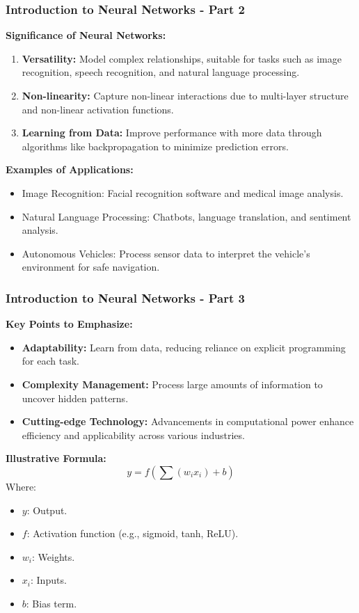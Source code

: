 \documentclass[aspectratio=169]{beamer}
\begin{document}
\begin{frame}[fragile]
    \frametitle{Introduction to Neural Networks - Part 2}
    \textbf{Significance of Neural Networks:}
    \begin{enumerate}
        \item \textbf{Versatility:} Model complex relationships, suitable for tasks such as image recognition, speech recognition, and natural language processing.
        \item \textbf{Non-linearity:} Capture non-linear interactions due to multi-layer structure and non-linear activation functions.
        \item \textbf{Learning from Data:} Improve performance with more data through algorithms like backpropagation to minimize prediction errors.
    \end{enumerate}
    
    \textbf{Examples of Applications:}
    \begin{itemize}
        \item Image Recognition: Facial recognition software and medical image analysis.
        \item Natural Language Processing: Chatbots, language translation, and sentiment analysis.
        \item Autonomous Vehicles: Process sensor data to interpret the vehicle's environment for safe navigation.
    \end{itemize}
\end{frame}

\begin{frame}[fragile]
    \frametitle{Introduction to Neural Networks - Part 3}
    \textbf{Key Points to Emphasize:}
    \begin{itemize}
        \item \textbf{Adaptability:} Learn from data, reducing reliance on explicit programming for each task.
        \item \textbf{Complexity Management:} Process large amounts of information to uncover hidden patterns.
        \item \textbf{Cutting-edge Technology:} Advancements in computational power enhance efficiency and applicability across various industries.
    \end{itemize}
    
    \textbf{Illustrative Formula:}
    \begin{equation}
        y = f\left(\sum (w_i x_i) + b\right)
    \end{equation}
    Where:
    \begin{itemize}
        \item $y$: Output.
        \item $f$: Activation function (e.g., sigmoid, tanh, ReLU).
        \item $w_i$: Weights.
        \item $x_i$: Inputs.
        \item $b$: Bias term.
    \end{itemize}
\end{frame}
\end{document}
